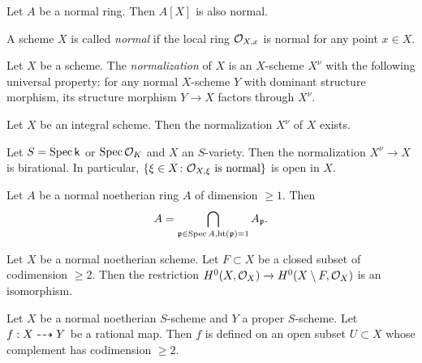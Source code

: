     \begin{proposition}
        Let $A$ be a normal ring.
        Then $A[X]$ is also normal.
    \end{proposition}

    \begin{definition}
        A scheme $X$ is called \textit{normal} if the local ring ${\mathcal{O}}_{X,x}$ is normal for any point $x\in X$.
    \end{definition}

    \begin{example}
        
    \end{example}

    \begin{definition}
        Let $X$ be a scheme.
        The \textit{normalization} of $X$ is an $X$-scheme $X^\nu$ with the following universal property:
        for any normal $X$-scheme $Y$ with dominant structure morphism, its structure morphism $Y \to X$ factors through $X^\nu$.
    \end{definition}

    \begin{proposition}
        Let $X$ be an integral scheme.
        Then the normalization $X^\nu$ of $X$ exists.
    \end{proposition}

    \begin{proposition}
        Let $S = \operatorname{Spec} {\mathsf{k}}$ or $\operatorname{Spec} {\mathcal{O}}_K$ and $X$ an $S$-variety.
        Then the normalization $X^\nu \to X$ is birational.
        In particular, $\{ \xi \in X \colon {\mathcal{O}}_{X,\xi} \text{ is normal} \}$ is open in $X$.
    \end{proposition}

    \begin{proposition}
        Let $A$ be a normal noetherian ring $A$ of dimension $\geq 1$.
        Then 
        \[ A = \bigcap_{{\mathfrak{p}} \in \operatorname{Spec} A, \operatorname{ht}({\mathfrak{p}}) = 1} A_{\mathfrak{p}}. \]
    \end{proposition}

    \begin{theorem}
        Let $X$ be a normal noetherian scheme.
        Let $F \subset X$ be a closed subset of codimension $\geq 2$.
        Then the restriction $H^0(X,{\mathcal{O}}_X) \to H^0(X\setminus F, {\mathcal{O}}_{X})$ is an isomorphism.
    \end{theorem}

    \begin{theorem}
        Let $X$ be a normal noetherian $S$-scheme and $Y$ a proper $S$-scheme.
        Let $f:X \dasharrow Y$ be a rational map.
        Then $f$ is defined on an open subset $U \subset X$ whose complement has codimension $\geq 2$.
    \end{theorem}

